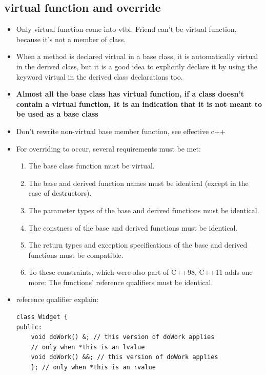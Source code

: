 \documentclass[a4paper,11pt,twoside]{book}
\begin{document}
\subsection{virtual function and override}
\begin{itemize}
	
	\item Only virtual function come into vtbl. Friend can't be virtual function, because it's not a member of class.
	
	\item When a method is declared virtual in a base class, it is automatically virtual in the derived class, but it is a good idea to explicitly declare it by using the keyword virtual in the derived class declarations too.
	
	\item \textbf{Almost all the base class has virtual function, if a class doesn't contain a virtual function, It is an indication that it is not meant to be used as a base class}
	
	\item Don't rewrite non-virtual base member function, see effective c++
	
	\item For overriding to occur, several requirements must be met:
	\begin{enumerate}
		\item The base class function must be virtual.
		\item The base and derived function names must be identical (except in the case of
		destructors).
		\item The parameter types of the base and derived functions must be identical.
		\item The constness of the base and derived functions must be identical.
		\item The return types and exception specifications of the base and derived functions
		must be compatible.
		\item To these constraints, which were also part of C++98, C++11 adds one more: The functions' reference qualifiers must be identical.
	\end{enumerate}
	\item reference qualifier explain:
\begin{lstlisting}[numbers=none]
class Widget {
public:
	void doWork() &; // this version of doWork applies
	// only when *this is an lvalue
	void doWork() &&; // this version of doWork applies
	}; // only when *this is an rvalue
	

\end{lstlisting}
\end{itemize}
\end{document}
